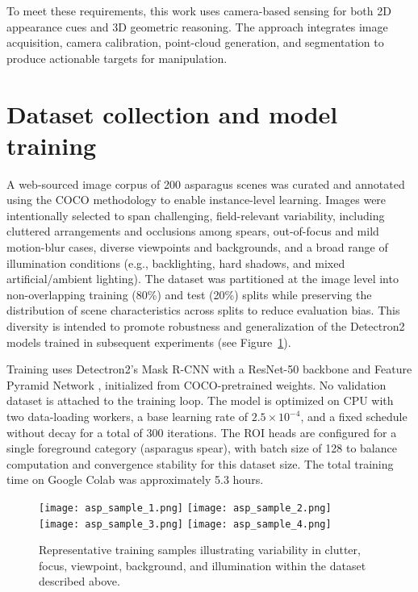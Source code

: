 To meet these requirements, this work uses camera-based sensing for both 2D appearance cues and 3D geometric reasoning. The approach integrates image acquisition, camera calibration, point-cloud generation, and segmentation to produce actionable targets for manipulation.

\section{Dataset collection and  model training}
A web-sourced image corpus of 200 asparagus scenes was curated and annotated using the COCO methodology to enable instance-level learning. 
Images were intentionally selected to span challenging, field-relevant variability, including cluttered arrangements and occlusions among 
spears, out-of-focus and mild motion-blur cases, diverse viewpoints and backgrounds, and a broad range of illumination conditions (e.g., 
backlighting, hard shadows, and mixed artificial/ambient lighting). The dataset was partitioned at the image level into non-overlapping 
training (80\%) and test (20\%) splits while preserving the distribution of scene characteristics across splits to reduce evaluation bias.
This diversity is intended to promote robustness and generalization of the Detectron2 models trained in subsequent experiments (see Figure~\ref{fig:dataset_samples}).

Training uses Detectron2's Mask R-CNN with a ResNet-50 backbone and Feature Pyramid Network ,
initialized from COCO-pretrained weights. No validation dataset is attached to the training loop. The model is optimized on CPU with two
 data-loading workers, a base learning rate of \(2.5\times10^{-4}\), and a fixed schedule without decay for a total of 300 iterations. The ROI heads
 are configured for a single foreground category (asparagus spear), with batch size of 128 to balance computation and convergence
 stability for this dataset size. The total training time on Google Colab was approximately 5.3 hours.

\begin{figure}[H]
\centering
\texttt{[image: asp\_sample\_1.png]}\hfill
\texttt{[image: asp\_sample\_2.png]}\\[0.5em]
\texttt{[image: asp\_sample\_3.png]}\hfill
\texttt{[image: asp\_sample\_4.png]}
\caption{Representative training samples illustrating variability in clutter, focus, viewpoint, background, and illumination within the dataset described above.}
\label{fig:dataset_samples}
\end{figure}


